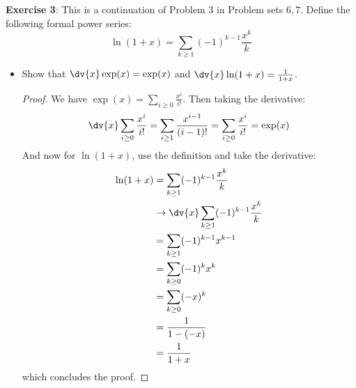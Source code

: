 \documentclass{article}
\begin{document}
\textbf{Exercise 3}: This is a continuation of Problem $3$ in Problem sets $6, 7$. Define the following formal power series:
    \begin{equation*}
        \ln(1 + x) = \sum_{k \geq1}(-1)^{k - 1}\dfrac{x^{k}}{k}
    \end{equation*}
    \begin{itemize}
        \item Show that $\dv{x}\exp(x) = \exp(x)$ and $\dv{x}\ln(1 + x) = \frac{1}{1 + x}$.
            \begin{proof}
                We have $\exp(x) = \sum_{i \geq0} \frac{x^{i}}{i!}$. Then taking the derivative:
                    \begin{equation*}
                        \dv{x}\sum_{i \geq0}\dfrac{x^{i}}{i!} = \sum_{i \geq1} \dfrac{x^{i - 1}}{(i - 1)!} = \sum_{i \geq 0}\dfrac{x^{i}}{i!} = \exp(x)
                    \end{equation*}
                And now for $\ln(1 + x)$, use the definition and take the derivative:
                    \begin{align*}
                        \ln(1 + x) &=           \sum_{k \geq 1}(-1)^{k - 1}\dfrac{x^{k}}{k}         \\
                                   &\rightarrow  \dv{x}\sum_{k  \geq 1}(-1)^{k - 1}\dfrac{x^{k}}{k} \\
                                   &=           \sum_{k \geq 1}(-1)^{k - 1}x^{k - 1}                \\
                                   &=           \sum_{k \geq 0}(-1)^{k}x^{k}                        \\
                                   &=           \sum_{k \geq 0}(-x)^{k}                             \\
                                   &=           \dfrac{1}{1 - (-x)}                                 \\
                                   &=           \dfrac{1}{1 + x}                                      
                    \end{align*}
                which concludes the proof.
            \end{proof}


\end{itemize}
\end{document}

